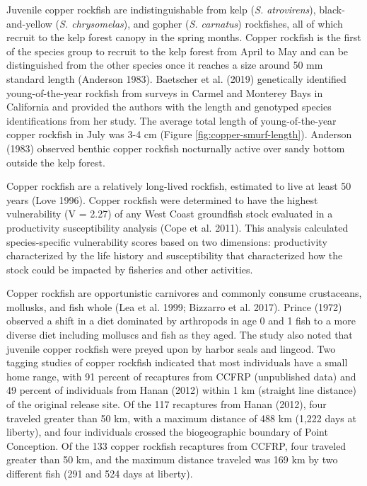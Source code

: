\documentclass[11pt,
  english,
  letterpaper,
]{article}
\begin{document}
Juvenile copper rockfish are indistinguishable from kelp (\emph{S. atrovirens}), black-and-yellow (\emph{S. chrysomelas}), and gopher (\emph{S. carnatus}) rockfishes, all of which recruit to the kelp forest canopy in the spring months. Copper rockfish is the first of the species group to recruit to the kelp forest from April to May and can be distinguished from the other species once it reaches a size around 50 mm standard length (Anderson 1983). Baetscher et al. (2019) genetically identified young-of-the-year rockfish from surveys in Carmel and Monterey Bays in California and provided the authors with the length and genotyped species identifications from her study. The average total length of young-of-the-year copper rockfish in July was 3-4 cm (Figure \ref{fig:copper-smurf-length}). Anderson (1983) observed benthic copper rockfish nocturnally active over sandy bottom outside the kelp forest.

Copper rockfish are a relatively long-lived rockfish, estimated to live at least 50 years (Love 1996). Copper rockfish were determined to have the highest vulnerability (V = 2.27) of any West Coast groundfish stock evaluated in a productivity susceptibility analysis (Cope et al. 2011). This analysis calculated species-specific vulnerability scores based on two dimensions: productivity characterized by the life history and susceptibility that characterized how the stock could be impacted by fisheries and other activities.

Copper rockfish are opportunistic carnivores and commonly consume crustaceans, mollusks, and fish whole (Lea et al. 1999; Bizzarro et al. 2017). Prince (1972) observed a shift in a diet dominated by arthropods in age 0 and 1 fish to a more diverse diet including molluscs and fish as they aged. The study also noted that juvenile copper rockfish were preyed upon by harbor seals and lingcod. Two tagging studies of copper rockfish indicated that most individuals have a small home range, with 91 percent of recaptures from CCFRP (unpublished data) and 49 percent of individuals from Hanan (2012) within 1 km (straight line distance) of the original release site. Of the 117 recaptures from Hanan (2012), four traveled greater than 50 km, with a maximum distance of 488 km (1,222 days at liberty), and four individuals crossed the biogeographic boundary of Point Conception. Of the 133 copper rockfish recaptures from CCFRP, four traveled greater than 50 km, and the maximum distance traveled was 169 km by two different fish (291 and 524 days at liberty).
\end{document}
